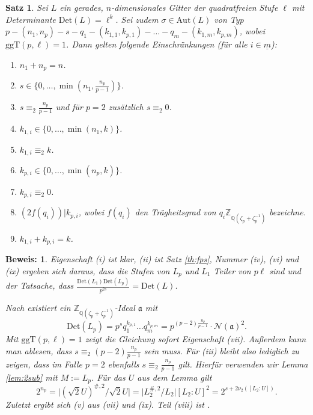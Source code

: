 \documentclass[12pt,a4paper,halfparskip,headsepline,bibtotocnumbered]{scrreprt}
\theoremstyle{nummermitklammern}
\newtheorem{satz}[defsatzusw]{Satz}
\theoremstyle{nonumberbreak}
\newtheorem{beweis}{Beweis:}
\newcommand{\Z}{\mathbb{Z}}
\newcommand{\Q}{\mathbb{Q}}
\newcommand{\No}{\mathcal{N}}
\newcommand{\Det}{\text{Det}}
\renewcommand{\a}{\mathfrak{a}}
\newcommand{\ggT}{\text{ggT}}
\newcommand{\Aut}{\text{Aut}}
\begin{document}
\begin{framed}
	\begin{satz} \label{th:restrict}
		Sei $L$ ein gerades, $n$-dimensionales Gitter der quadratfreien Stufe $\ell$ mit Determinante $\Det(L) = \ell^k$. Sei zudem $\sigma \in \Aut(L)$ von Typ $p - (n_1, n_p) - s - q_1 - (k_{1,1}, k_{p,1}) - \dots - q_m - (k_{1,m}, k_{p,m})$, wobei $\ggT(p, \ell) = 1$. Dann gelten folgende Einschränkungen (für alle $i \in \underline{m}$):
		\begin{enumerate}[label=(\roman*)]
			\item $n_1 + n_p = n$.
			\item $s \in \lbrace 0, \dots, \min(n_1, \frac{n_p}{p-1}) \rbrace$.
			\item $s \equiv_2 \frac{n_p}{p-1}$ und für $p = 2$ zusätzlich $s \equiv_2 0$.
			\item $k_{1,i} \in \lbrace 0, \dots, \min(n_1, k) \rbrace$.
			\item $k_{1,i} \equiv_2 k$.
			\item $k_{p,i} \in \lbrace 0, \dots, \min(n_p, k) \rbrace$.
			\item $k_{p,i} \equiv_2 0$.
			\item $\left( 2f(q_i)\right) \vert k_{p,i}$, wobei $f(q_i)$ den Trägheitsgrad von $q_i \Z_{\Q(\zeta_p + \zeta_p^{-1})}$ bezeichne.
			\item $k_{1,i} + k_{p,i} = k$.
		\end{enumerate}
	\end{satz}
\end{framed}
\begin{beweis}
	Eigenschaft (i) ist klar, (ii) ist Satz \eqref{th:fps}, Nummer (iv), (vi) und (ix) ergeben sich daraus, dass die Stufen von $L_p$ und $L_1$ Teiler von $p \ell$ sind und der Tatsache, dass $\frac{\Det(L_1) \Det(L_p)}{p^{2s}} = \Det(L)$.\par
	Nach \cite[Satz (3.1.4)(d) und Lemma (3.1.1)]{juergens} existiert ein $\Z_{\Q(\zeta_p + \zeta_p^{-1})}$-Ideal $\a$ mit
	\begin{equation*}
		\Det(L_p) = p^s q_1^{k_{p,1}} \dots q_m^{k_{p,m}} = p^{(p-2)\frac{n_p}{p-1}} \cdot \No(\a)^2.
	\end{equation*}
	Mit $\ggT(p, \ell) = 1$ zeigt die Gleichung sofort Eigenschaft (vii). Außerdem kann man ablesen, dass $s \equiv_2 (p-2)\frac{n_p}{p-1}$ sein muss. Für (iii) bleibt also lediglich zu zeigen, dass im Falle $p=2$ ebenfalls $s \equiv_2 \frac{n_p}{p-1}$ gilt. Hierfür verwenden wir Lemma \eqref{lem:2sub} mit $M := L_p$. Für das $U$ aus dem Lemma gilt
	\begin{equation*}
		2^{n_p} = \vert (\sqrt{2}U)^{\#,2} / \sqrt{2} U \vert = \vert L_2^{\#,2} / L_2 \vert [L_2 : U]^2 = 2^{s + 2 \nu_2([L_2 : U])}.
	\end{equation*}
	Zuletzt ergibt sich (v) aus (vii) und (ix). Teil (viii) ist \cite[Korollar (4.1.9)]{juergens}.
\end{beweis}
\end{document}
